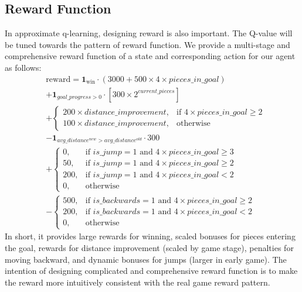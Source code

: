 \subsection{Reward Function}
In approximate q-learning, designing reward is also important. The Q-value will be tuned towards the pattern of reward function. We provide a multi-stage and comprehensive reward function of a state and corresponding action for our agent as follows:
\begin{equation}
\begin{split}
& \text{reward} = \mathbf{1}_{\text{win}} \cdot \left(3000 + 500 \times 4 \times pieces\_in\_goal\right)
\\
&+ \mathbf{1}_{goal\_progress > 0} \cdot \left[300 \times 2^{current\_pieces}\right]
\\
&+ 
\begin{cases}
200 \times distance\_improvement, & \text{if } 4 \times pieces\_in\_goal \geq 2 \\
100 \times distance\_improvement, & \text{otherwise}
\end{cases}
\\
&- \mathbf{1}_{avg\_distance^{new} > avg\_distance^{old}} \cdot 300
\\
&+ 
\begin{cases}
0, & \text{if } is\_jump = 1 \text{ and } 4 \times pieces\_in\_goal \geq 3 \\
50, & \text{if } is\_jump = 1 \text{ and } 4 \times pieces\_in\_goal \geq 2 \\
200, & \text{if } is\_jump = 1 \text{ and } 4 \times pieces\_in\_goal < 2 \\
0, & \text{otherwise}
\end{cases}
\\
&-
\begin{cases}
500, & \text{if } is\_backwards = 1 \text{ and } 4 \times pieces\_in\_goal \geq 2 \\
200, & \text{if } is\_backwards = 1 \text{ and } 4 \times pieces\_in\_goal < 2 \\
0, & \text{otherwise}
\end{cases}
\end{split}
\end{equation}
In short, it provides large rewards for winning, scaled bonuses for pieces entering the goal, rewards for distance improvement (scaled by game stage), penalties for moving backward, and dynamic bonuses for jumps (larger in early game). The intention of designing complicated and comprehensive reward function is to make the reward more intuitively consistent with the real game reward pattern. 

